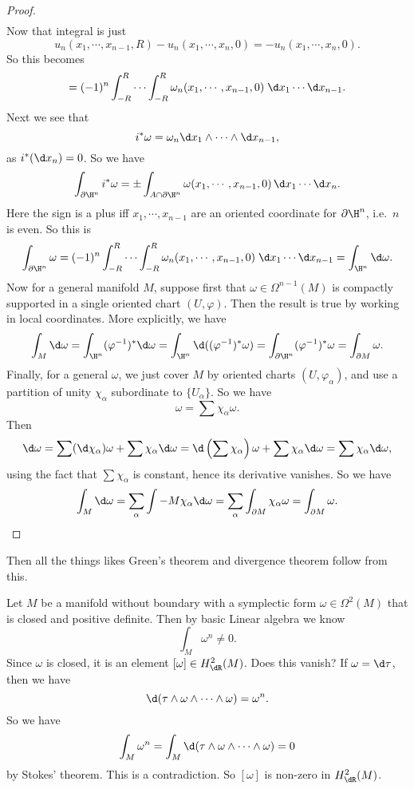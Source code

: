 \documentclass[a4paper]{article}
\begin{document}
\begin{proof}
\begin{align*}
  \end{align*}
  Now that integral is just
  \[
    u_n(x_1, \cdots, x_{n - 1}, R) - u_n(x_1, \cdots, x_n, 0) = -u_n(x_1, \cdots, x_n, 0).
  \]
  So this becomes
  \[
    =(-1)^n \int_{-R}^R \cdots \int_{-R}^R \omega_n(x_1, \cdots, x_{n - 1}, 0)\;\d x_1 \cdots \d x_{n - 1}.
  \]
  Next we see that
  \[
    i^* \omega = \omega_n \d x_1 \wedge \cdots \wedge \d x_{n - 1},
  \]
  as $i^*(\d x_n) = 0$. So we have
  \[
    \int_{\partial \H^n} i^* \omega = \pm \int_{A \cap \partial \H^n} \omega(x_1, \cdots, x_{n - 1}, 0) \, \d x_1 \cdots \d x_n.
  \]
  Here the sign is a plus iff $x_1, \cdots, x_{n - 1}$ are an oriented coordinate for $\partial \H^n$, i.e.\ $n$ is even. So this is
  \[
    \int_{\partial \H^n} \omega = (-1)^n \int_{-R}^R \cdots \int_{-R}^R \omega_n(x_1, \cdots, x_{n - 1}, 0)\;\d x_1 \cdots \d x_{n - 1} = \int_{\H^n} \d \omega.
  \]
  Now for a general manifold $M$, suppose first that $\omega \in \Omega^{n - 1}(M)$ is compactly supported in a single oriented chart $(U, \varphi)$. Then the result is true by working in local coordinates. More explicitly, we have
  \[
    \int_M \d \omega = \int_{\H^n}(\varphi^{-1})^* \d \omega = \int_{\H^n} \d((\varphi^{-1})^* \omega) = \int_{\partial \H^n} (\varphi^{-1})^* \omega = \int_{\partial M} \omega.
  \]
  Finally, for a general $\omega$, we just cover $M$ by oriented charts $(U, \varphi_\alpha)$, and use a partition of unity $\chi_\alpha$ subordinate to $\{U_\alpha\}$. So we have
  \[
    \omega = \sum \chi_\alpha \omega.
  \]
  Then
  \[
    \d \omega = \sum (\d \chi_\alpha) \omega + \sum \chi_\alpha \d \omega = \d\left(\sum \chi_\alpha\right) \omega + \sum \chi_\alpha \d \omega = \sum \chi_\alpha \d \omega,
  \]
  using the fact that $\sum \chi_\alpha$ is constant, hence its derivative vanishes. So we have
  \[
    \int_M \d \omega = \sum_\alpha \int-M \chi_\alpha \d \omega = \sum_\alpha \int_{\partial M} \chi_\alpha \omega = \int_{\partial M}\omega. \qedhere
  \]
\end{proof}
Then all the things likes Green's theorem and divergence theorem follow from this.

\begin{eg}
  Let $M$ be a manifold without boundary with a symplectic form $\omega \in \Omega^2(M)$ that is closed and positive definite. Then by basic Linear algebra we know
  \[
    \int_M \omega^n \not= 0.
  \]
  Since $\omega$ is closed, it is an element $[\omega] \in H_{\dR}^2 (M)$. Does this vanish? If $\omega = \d \tau$, then we have
  \[
    \d (\tau \wedge \omega \wedge \cdots \wedge \omega) = \omega^n.
  \]
  So we have
  \[
    \int_M \omega^n = \int_M \d (\tau \wedge \omega \wedge \cdots \wedge \omega) = 0
  \]
  by Stokes' theorem. This is a contradiction. So $[\omega]$ is non-zero in $H^2_{\dR}(M)$.
\end{eg}
\end{document}
